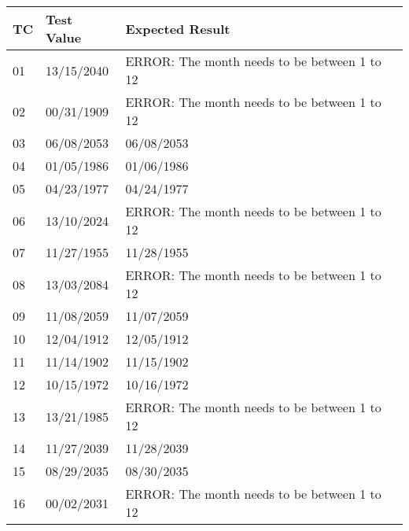 \documentclass[11pt, oneside]{article}   	%
\begin{document}
\begin{table}[H]
\begin{tabular}{|l|l|l|}
\hline
TC & Test Value & Expected Result                              \\ \hline
01 & 13/15/2040 & ERROR: The month needs to be between 1 to 12 \\ \hline
02 & 00/31/1909 & ERROR: The month needs to be between 1 to 12 \\ \hline
03 & 06/08/2053 & 06/08/2053                                   \\ \hline
04 & 01/05/1986 & 01/06/1986                                   \\ \hline
05 & 04/23/1977 & 04/24/1977                                   \\ \hline
06 & 13/10/2024 & ERROR: The month needs to be between 1 to 12 \\ \hline
07 & 11/27/1955 & 11/28/1955                                   \\ \hline
08 & 13/03/2084 & ERROR: The month needs to be between 1 to 12 \\ \hline
09 & 11/08/2059 & 11/07/2059                                   \\ \hline
10 & 12/04/1912 & 12/05/1912                                   \\ \hline
11 & 11/14/1902 & 11/15/1902                                   \\ \hline
12 & 10/15/1972 & 10/16/1972                                   \\ \hline
13 & 13/21/1985 & ERROR: The month needs to be between 1 to 12 \\ \hline
14 & 11/27/2039 & 11/28/2039                                   \\ \hline
15 & 08/29/2035 & 08/30/2035                                   \\ \hline
16 & 00/02/2031 & ERROR: The month needs to be between 1 to 12 \\ \hline
\end{tabular}
\end{table}
\end{document}
